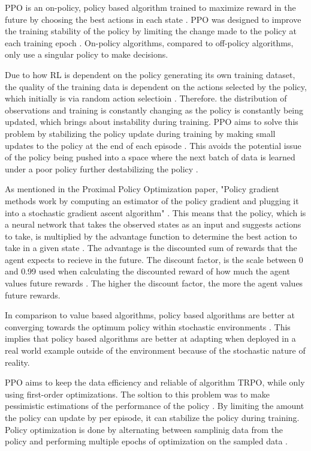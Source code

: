 PPO is an on-policy, policy based algorithm trained to maximize reward in the future by choosing the best actions in each state \cite{deepcheckRL}. PPO was designed to improve the training stability of the policy by limiting the change made to the policy at each training epoch \cite{ThomasSimonini2022A2C}. On-policy algorithms, compared to off-policy algorithms, only use a singular policy to make decisions.

Due to how RL is dependent on the policy generating its own training dataset, the quality of the training data is dependent on the actions selected by the policy, which initially is via random action selectioin \cite{XanderSteenbrugge2019ppo}. Therefore. the distribution of observations and training is constantly changing as the policy is constantly being updated, which brings about instability during training. PPO aims to solve this problem by stabilizing the policy update during training by making small updates to the policy at the end of each episode \cite{XanderSteenbrugge2019intro}. This avoids the potential issue of the policy being pushed into a space where the next batch of data is learned under a poor policy further destabilizing the policy \cite{XanderSteenbrugge2019ppo}.

As mentioned in the Proximal Policy Optimization paper, "Policy gradient methods work by computing an estimator of the policy gradient and plugging it into a stochastic gradient ascent algorithm" \cite{schulman2017proximal}. This means that the policy, which is a neural network that takes the observed states as an input and suggests actions to take, is multiplied by the advantage function to determine the best action to take in a given state \cite{schulman2017proximal}. The advantage is the discounted sum of rewards that the agent expects to recieve in the future. The discount factor, is the scale between 0 and 0.99 used when calculating the discounted reward of how much the agent values future rewards \cite{XanderSteenbrugge2019ppo}. The higher the discount factor, the more the agent values future rewards. 

In comparison to value based algorithms, policy based algorithms are better at converging towards the optimum policy within stochastic environments \cite{mnih2015human}. This implies that policy based algorithms are better at adapting when deployed in a real world example outside of the environment because of the stochastic nature of reality. 

PPO aims to keep the data efficiency and reliable of algorithm TRPO, while only using first-order optimizations. The soltion to this problem was to make pessimistic estimations of the performance of the policy \cite{schulman2017proximal}. By limiting the amount the policy can update by per episode, it can stabilize the policy during training. Policy optimization is done by alternating between samplinig data from the policy and performing multiple epochs of optimization on the sampled data \cite{schulman2017proximal}. 

